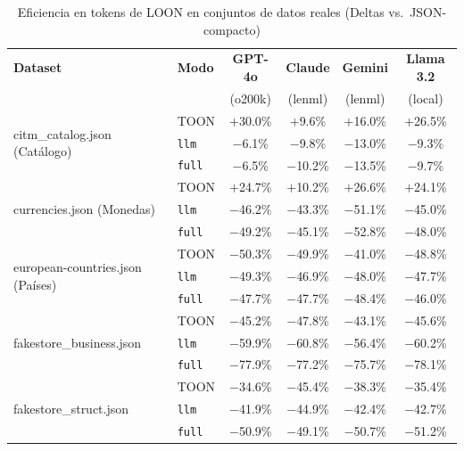 \begin{table}[t]
  \centering
  \caption{Eficiencia en tokens de LOON en conjuntos de datos reales (Deltas vs.\ JSON-compacto)}
  \label{tab:tokens-real}
  \scriptsize
  \begin{tabular}{@{}llcccc@{}}
    \toprule
    \textbf{Dataset} & \textbf{Modo} & \textbf{GPT-4o} & \textbf{Claude} & \textbf{Gemini} & \textbf{Llama 3.2} \\
     & & \scriptsize (o200k) & \scriptsize (lenml) & \scriptsize (lenml) & \scriptsize (local) \\
    \midrule
    \multirow{3}{*}{citm\_catalog.json (Catálogo)} & TOON & $+$30.0\% & $+$9.6\% & $+$16.0\% & $+$26.5\% \\
     & \texttt{llm} & $-$6.1\% & $-$9.8\% & $-$13.0\% & $-$9.3\% \\
     & \texttt{full} & $-$6.5\% & $-$10.2\% & $-$13.5\% & $-$9.7\% \\
    \cline{2-6}
    \multirow{3}{*}{currencies.json (Monedas)} & TOON & $+$24.7\% & $+$10.2\% & $+$26.6\% & $+$24.1\% \\
     & \texttt{llm} & $-$46.2\% & $-$43.3\% & $-$51.1\% & $-$45.0\% \\
     & \texttt{full} & $-$49.2\% & $-$45.1\% & $-$52.8\% & $-$48.0\% \\
    \cline{2-6}
    \multirow{3}{*}{european-countries.json (Países)} & TOON & $-$50.3\% & $-$49.9\% & $-$41.0\% & $-$48.8\% \\
     & \texttt{llm} & $-$49.3\% & $-$46.9\% & $-$48.0\% & $-$47.7\% \\
     & \texttt{full} & $-$47.7\% & $-$47.7\% & $-$48.4\% & $-$46.0\% \\
    \cline{2-6}
    \multirow{3}{*}{fakestore\_business.json} & TOON & $-$45.2\% & $-$47.8\% & $-$43.1\% & $-$45.6\% \\
     & \texttt{llm} & $-$59.9\% & $-$60.8\% & $-$56.4\% & $-$60.2\% \\
     & \texttt{full} & $-$77.9\% & $-$77.2\% & $-$75.7\% & $-$78.1\% \\
    \cline{2-6}
    \multirow{3}{*}{fakestore\_struct.json} & TOON & $-$34.6\% & $-$45.4\% & $-$38.3\% & $-$35.4\% \\
     & \texttt{llm} & $-$41.9\% & $-$44.9\% & $-$42.4\% & $-$42.7\% \\
     & \texttt{full} & $-$50.9\% & $-$49.1\% & $-$50.7\% & $-$51.2\% \\

\end{tabular}
\end{table}
